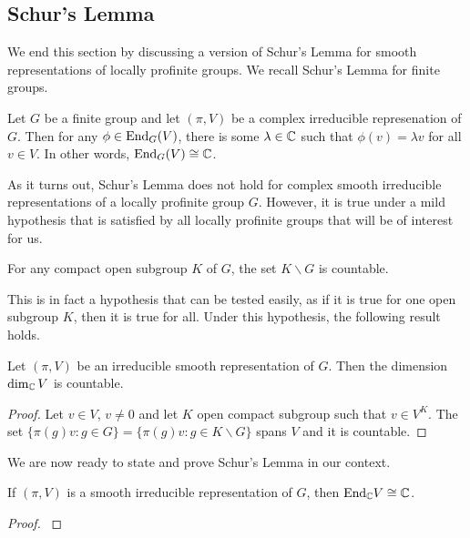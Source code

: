 \subsection{Schur's Lemma}

We end this section by discussing a version of Schur's Lemma for smooth representations of locally profinite groups. We recall Schur's Lemma for finite groups.

\begin{thm}
    Let $G$ be a finite group and let $(\pi,V)$ be a complex irreducible represenation of $G$. Then for any $\phi\in\mathrm{End}_G(V)$, there is some $\lambda\in\mathbb{C}$ such that $\phi(v)=\lambda v$ for all $v\in V$. In other words, $\mathrm{End}_G(V)\cong\mathbb{C}$.
\end{thm}

As it turns out, Schur's Lemma does not hold for complex smooth irreducible representations of a locally profinite group $G$. However, it is true under a mild hypothesis that is satisfied by all locally profinite groups that will be of interest for us.

\begin{hypothesis}
    For any compact open subgroup $K$ of $G$, the set $K\backslash G$ is countable.
\end{hypothesis}

This is in fact a hypothesis that can be tested easily, as if it is true for one open subgroup $K$, then it is true for all. Under this hypothesis, the following result holds.

\begin{lemma}
    Let $(\pi,V)$ be an irreducible smooth representation of $G$. Then the dimension $\dim_{\mathbb{C}}V$ is countable.
\end{lemma}
\begin{proof}
    Let $v\in V$, $v\neq0$ and let $K$ open compact subgroup such that $v\in V^K$. The set $\{\pi(g)v:g\in G\}=\{\pi(g)v:g\in K\backslash G\}$ spans $V$ and it is countable.
\end{proof}

We are now ready to state and prove Schur's Lemma in our context.

\begin{thm}
    If $(\pi,V)$ is a smooth irreducible representation of $G$, then $\mathrm{End}_{\mathbb{C}}V\cong \mathbb{C}$.
\end{thm}
\begin{proof}
    \cite[2.6 Schur's Lemma]{BH1}
\end{proof}

